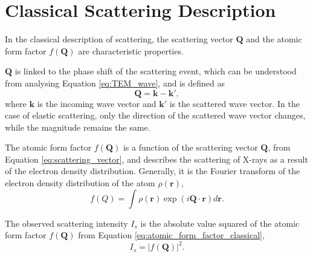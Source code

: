 

\section{Classical Scattering Description}\label{sec:classical_scattering}

In the classical description of scattering, the scattering vector $\bm{Q}$ and the atomic form factor $f(\bm{Q})$ are characteristic properties.

$\bm{Q}$ is linked to the phase shift of the scattering event, which can be understood from analysing Equation \eqref{eq:TEM_wave}, and is defined as
\begin{equation}\label{eq:scattering_vector}
    \bm{Q} = \bm{k} - \bm{k'},
\end{equation}
where $\bm{k}$ is the incoming wave vector and $\bm{k'}$ is the scattered wave vector.
In the case of elastic scattering, only the direction of the scattered wave vector changes, while the magnitude remains the same.

The atomic form factor $f(\bm{Q})$ is a function of the scattering vector $\bm{Q}$, from Equation \eqref{eq:scattering_vector},
and describes the scattering of X-rays as a result of the electron density distribution.
Generally, it is the Fourier transform of the electron density distribution of the atom $\rho(\bm{r})$,
\begin{equation}\label{eq:atomic_form_factor_classical}
    f(Q) = \int \rho(\bm{r}) \exp\left(i\bm{Q}\cdot\bm{r}\right) d\bm{r}.
\end{equation}

The observed scattering intensity $I_{s}$ is the absolute value squared of the atomic form factor $f(\bm{Q})$ from Equation \eqref{eq:atomic_form_factor_classical},
\begin{equation}\label{eq:scattering_intensity_classical}
    I_{s} = |f(\bm{Q})|^{2}.
\end{equation}


